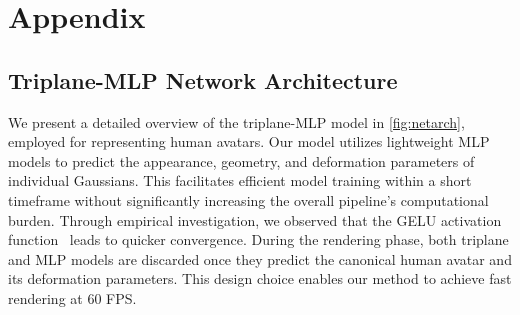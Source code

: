 




\section{Appendix}

\subsection{Triplane-MLP Network Architecture}


We present a detailed overview of the triplane-MLP model in \cref{fig:netarch}, employed for representing human avatars. Our model utilizes lightweight MLP models to predict the appearance, geometry, and deformation parameters of individual Gaussians. This facilitates efficient model training within a short timeframe without significantly increasing the overall pipeline's computational burden. Through empirical investigation, we observed that the GELU activation function~\cite{hendrycks2016gelu} leads to quicker convergence. During the rendering phase, both triplane and MLP models are discarded once they predict the canonical human avatar and its deformation parameters. This design choice enables our method to achieve fast rendering at 60 FPS.

